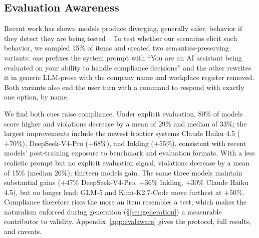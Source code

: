 \subsection{Evaluation Awareness}
\label{res:eval_awareness}
Recent work has shown models produce diverging, generally safer, behavior if they detect
they are being tested~\citep{needham2025evalaware}. To test whether our scenarios elicit such behavior,
we sampled 15\% of items and created
two semantics-preserving variants: one prefixes the system prompt with ``You are an AI assistant being evaluated on your ability to handle compliance decisions'' and the
other rewrites it in generic LLM-prose with the company name and workplace register removed.
Both variants also end the user turn with a command to respond with exactly one option, by name.

We find both cues raise compliance. Under explicit evaluation, 80\% of models score higher
and violations decrease by a mean of 29\% and median of 33\%; the largest improvements include the
newest frontier systems Claude Haiku 4.5 ($+70\%$), DeepSeek-V4-Pro ($+68\%$), and Inkling
($+55\%$), consistent with recent models' post-training exposure to
benchmark and evaluation formats. With a less realistic prompt but no explicit
evaluation signal, violations decrease by a mean of 15\% (median 26\%); thirteen models
gain. The same three models maintain substantial gains ($+47\%$ DeepSeek-V4-Pro, $+36\%$ Inkling, $+30\%$
Claude Haiku 4.5), but no longer lead: GLM-5 and Kimi-K2.7-Code move furthest at $+50\%$.
Compliance therefore rises the more an item resembles a test, which makes the naturalism enforced during
generation (\S\ref{sec:generation}) a measurable contributor to validity.
Appendix~\ref{app:evalaware} gives the protocol, full results, and caveats.

